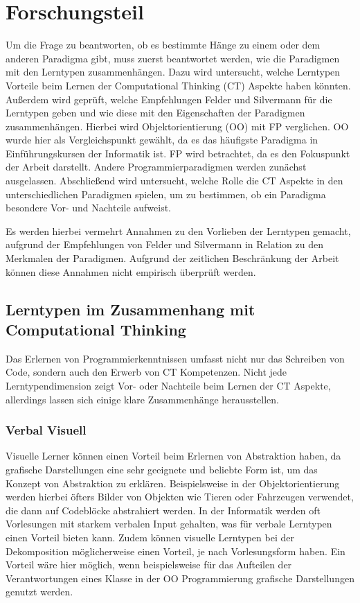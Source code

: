 \clearpage
\section{Forschungsteil}
\label{sec:work}

Um die Frage zu beantworten, ob es bestimmte Hänge zu einem oder dem anderen Paradigma gibt, muss zuerst beantwortet werden, wie die Paradigmen mit den Lerntypen zusammenhängen. 
Dazu wird untersucht, welche Lerntypen Vorteile beim Lernen der Computational Thinking (CT) Aspekte haben könnten. Außerdem wird geprüft, welche Empfehlungen Felder und Silvermann für die Lerntypen geben und wie diese mit den Eigenschaften der Paradigmen zusammenhängen.
Hierbei wird Objektorientierung (OO) mit FP verglichen. OO wurde hier als Vergleichspunkt gewählt, da es das häufigste Paradigma in Einführungskursen der Informatik ist. FP wird betrachtet, da es den Fokuspunkt der Arbeit darstellt. Andere Programmierparadigmen werden zunächst ausgelassen.
Abschließend wird untersucht, welche Rolle die CT Aspekte in den unterschiedlichen Paradigmen spielen, um zu bestimmen, ob ein Paradigma besondere Vor- und Nachteile aufweist.

Es werden hierbei vermehrt Annahmen zu den Vorlieben der Lerntypen gemacht, aufgrund der Empfehlungen von Felder und Silvermann in Relation zu den Merkmalen der Paradigmen. Aufgrund der zeitlichen Beschränkung der Arbeit können diese Annahmen nicht empirisch überprüft werden.

\subsection{Lerntypen im Zusammenhang mit Computational Thinking}
Das Erlernen von Programmierkenntnissen umfasst nicht nur das Schreiben von Code, sondern auch den Erwerb von CT Kompetenzen.
Nicht jede Lerntypendimension zeigt Vor- oder Nachteile beim Lernen der CT Aspekte, allerdings lassen sich einige klare Zusammenhänge herausstellen.

\subsubsection{Verbal Visuell}
Visuelle Lerner können einen Vorteil beim Erlernen von Abstraktion haben, da grafische Darstellungen eine sehr geeignete und beliebte Form ist, um das Konzept von Abstraktion zu erklären. Beispielsweise in der Objektorientierung werden hierbei öfters Bilder von Objekten wie Tieren oder Fahrzeugen verwendet, die dann auf Codeblöcke abstrahiert werden.
In der Informatik werden oft Vorlesungen mit starkem verbalen Input gehalten, was für verbale Lerntypen einen Vorteil bieten kann.
Zudem können visuelle Lerntypen bei der Dekomposition möglicherweise einen Vorteil, je nach Vorlesungsform haben. Ein Vorteil wäre hier möglich, wenn beispielsweise für das Aufteilen der Verantwortungen eines Klasse in der OO Programmierung grafische Darstellungen genutzt werden.

